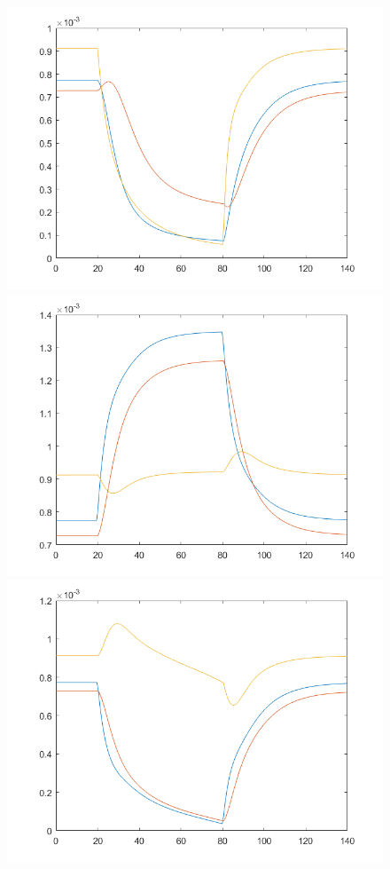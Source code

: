 \begin{figure}[h!]
\includegraphics[scale=0.3]{../c2.png}\\
\includegraphics[scale=0.3]{../a3.png}\hspace{0.01cm}
\includegraphics[scale=0.3]{../b3.png}\hspace{0.01cm}

\end{figure}
